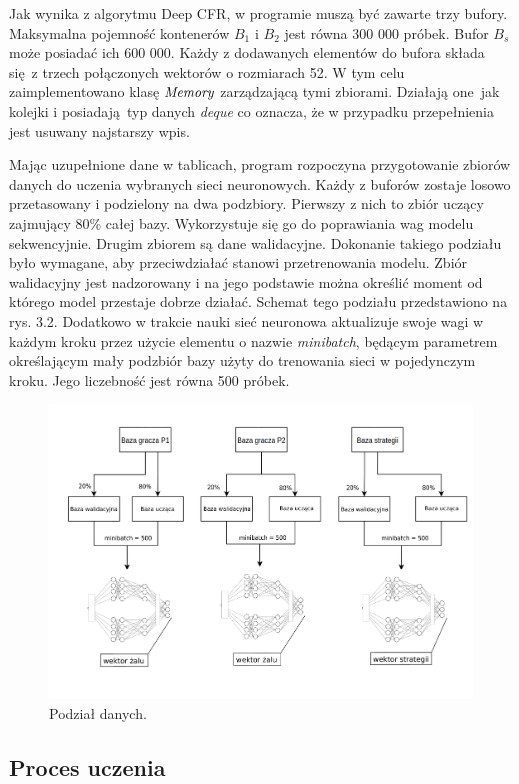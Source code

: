 \documentclass[12pt,oneside,a4paper]{report}
\begin{document}
Jak wynika z algorytmu Deep CFR, w programie muszą być zawarte trzy bufory.
Maksymalna pojemność kontenerów $B_{1}$ i $B_{2}$ jest równa 300 000 próbek.
Bufor $B_{s}$ może posiadać ich 600 000. Każdy z dodawanych elementów do bufora składa się z
trzech połączonych wektorów o rozmiarach 52. W tym celu
zaimplementowano klasę $\emph{Memory}$ zarządzającą tymi zbiorami. Działają one jak 
kolejki i posiadają typ danych \emph{deque} co oznacza, że
w przypadku przepełnienia jest usuwany najstarszy wpis.

Mając uzupełnione dane w tablicach, program rozpoczyna przygotowanie zbiorów danych do uczenia
wybranych
sieci neuronowych. Każdy z buforów zostaje losowo przetasowany i podzielony na dwa podzbiory.
Pierwszy z nich to zbiór uczący zajmujący 80\% całej bazy. Wykorzystuje się go do poprawiania wag modelu sekwencyjnie.
Drugim zbiorem
są dane walidacyjne. Dokonanie takiego podziału było wymagane, aby przeciwdziałać stanowi
przetrenowania modelu. Zbiór walidacyjny jest nadzorowany i na jego podstawie można określić 
moment od którego model przestaje dobrze działać. Schemat tego
podziału przedstawiono na rys. 3.2. 
Dodatkowo w trakcie nauki sieć neuronowa aktualizuje swoje wagi w każdym kroku przez użycie elementu o nazwie
\emph{minibatch}, będącym parametrem określającym
mały podzbiór bazy użyty do trenowania sieci w pojedynczym kroku. Jego liczebność jest równa 500
próbek.

\begin{figure}[!ht]
  \centering
  \includegraphics[width=1\textwidth]{./img/bzd.pdf}
  \caption{Podział danych.}
\end{figure}


\subsection{Proces uczenia}
\end{document}
